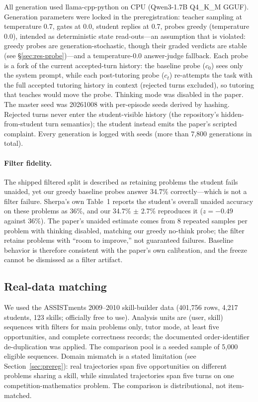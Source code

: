 \documentclass[notitlepage,12pt]{jedm}
\begin{document}
All generation used llama-cpp-python on CPU (Qwen3-1.7B Q4\_K\_M GGUF).
Generation parameters were locked in the preregistration: teacher sampling
at temperature 0.7, gates at 0.0, student replies at 0.7, probes greedy
(temperature 0.0), intended as deterministic state read-outs---an assumption
that is violated: greedy probes are generation-stochastic, though their
graded verdicts are stable (see \S\ref{sec:res-probe})---and a temperature-0.0
answer-judge fallback. Each probe is a fork of the current accepted-turn
history: the baseline probe ($c_0$) sees only the system prompt, while each
post-tutoring probe ($c_t$) re-attempts the task with the full accepted
tutoring history in context (rejected turns excluded), so tutoring that
teaches would move the probe. Thinking mode was disabled in the paper. The master
seed was 20261008 with per-episode seeds derived by hashing. Rejected turns
never enter the student-visible history (the repository's hidden-from-student
turn semantics); the student instead emits the paper's scripted complaint.
Every generation is logged with seeds (more than 7{,}800 generations in
total).

\paragraph{Filter fidelity.} The shipped filtered split is described as
retaining problems the student fails unaided, yet our greedy baseline
probes answer 34.7\% correctly---which is not a filter failure. Sherpa's
own Table~1 reports the student's overall unaided accuracy on these
problems as 36\%, and our 34.7\% $\pm$ 2.7\% reproduces it ($z=-0.49$
against 36\%). The paper's unaided estimate comes from 8 repeated samples
per problem with thinking disabled, matching our greedy no-think probe;
the filter retains problems with ``room to improve,'' not guaranteed
failures. Baseline behavior is therefore consistent with the paper's own
calibration, and the freeze cannot be dismissed as a filter artifact.

\subsection{Real-data matching}

We used the ASSISTments 2009--2010 skill-builder data (401{,}756 rows,
4{,}217 students, 123 skills; officially free to use). Analysis units are
(user, skill) sequences with filters for main problems only, tutor mode, at
least five opportunities, and complete correctness records; the documented
order-identifier de-duplication was applied. The comparison pool is a seeded
sample of 5{,}000 eligible sequences. Domain mismatch is a stated limitation
(see Section~\ref{sec:prereg}): real trajectories span five opportunities on
different problems sharing a skill, while simulated trajectories span five
turns on one competition-mathematics problem. The comparison is
distributional, not item-matched.
\end{document}
